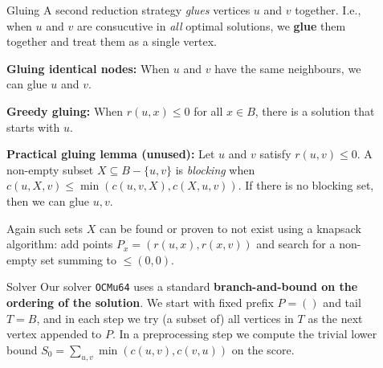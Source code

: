 \documentclass[final]{beamer}
\newlength{\sepwidth}
\newlength{\colwidth}
\newcommand{\separatorcolumn}{\begin{column}{\sepwidth}\end{column}}
\theoremstyle{remark}
\newcommand{\be}{\preceq}
\begin{document}
\begin{frame}[t]
\begin{columns}[t]
\begin{column}{\colwidth}


    \end{column}

    \separatorcolumn

    \begin{column}{\colwidth}
      \begin{block}{Gluing}
        A second reduction strategy \emph{glues} vertices $u$ and $v$ together.
        I.e., when $u$ and $v$ are consucutive in \emph{all} optimal solutions,
        we \textbf{glue} them together and treat them as a single vertex.

        \textbf{Gluing identical nodes:}
        When $u$ and $v$ have the same neighbours, we can glue $u$ and $v$.

        \textbf{Greedy gluing:}
        When $r(u, x)\leq 0$ for all $x\in B$, there is a solution that
        starts with $u$.

        \textbf{Practical gluing lemma (unused):}
        Let $u$ and $v$ satisfy $r(u, v) \leq 0$.
        A non-empty subset $X\subseteq B-\{u,v\}$ is \emph{blocking} when $c(u, X, v) \leq
        \min(c(u, v, X), c(X, u, v))$. If there is no blocking set, then we can glue $u, v$.

        Again such sets $X$ can be found or proven to not exist using a knapsack
        algorithm: add points $P_x = (r(u, x), r(x, v))$ and search for a non-empty
        set summing to $\leq{}(0,0)$.
      \end{block}

      \begin{block}{Solver}
        Our solver \texttt{OCMu64} uses a standard \textbf{branch-and-bound on the ordering of the
        solution}.  We start with fixed prefix $P=()$ and tail $T=B$, and in each step we try (a
        subset of) all vertices in $T$ as the next vertex appended to $P$.
        In a preprocessing step we compute the trivial lower bound $S_0 =
        \sum_{u,v}\min(c(u,v),c(v,u))$ on the score.


\end{block}
\end{column}
\end{columns}
\end{frame}
\end{document}
